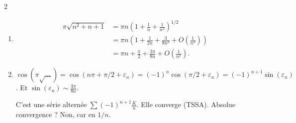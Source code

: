\begin{correction}{2}
\begin{enumerate}
    \item \begin{align*}
            \pi\sqrt{n^2+n+1} &= \pi n \left(1 + \frac{1}{n} + \frac{1}{n^2}\right)^{1/2} \\
            &= \pi n \left(1 + \frac{1}{2n} + \frac{3}{8n^2} + O\left(\frac{1}{n^3}\right)\right) \\
            &= \pi n + \frac{\pi}{2} + \frac{3\pi}{8n} + O\left(\frac{1}{n^2}\right).
        \end{align*}
    
    \item $\cos(\pi\sqrt{\dots}) = \cos(n\pi + \pi/2 + \varepsilon_n) = (-1)^n \cos(\pi/2 + \varepsilon_n) = (-1)^{n+1} \sin(\varepsilon_n)$.
        Et $\sin(\varepsilon_n) \sim \frac{3\pi}{8n}$.

        C'est une série alternée $\sum (-1)^{n+1} \frac{K}{n}$. Elle converge (TSSA).
        Absolue convergence ? Non, car en $1/n$.
\end{enumerate}
\end{correction}

